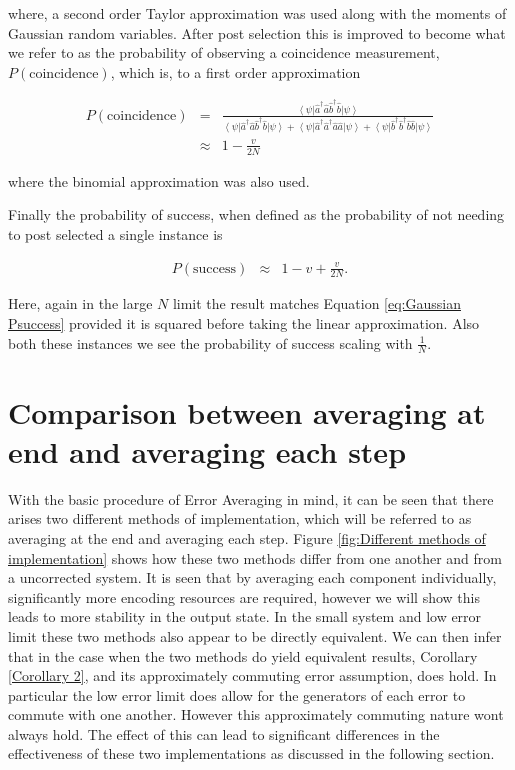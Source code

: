 \documentclass[aps,pra,twocolumn,superscriptaddress,numerical]{revtex4-1}
\begin{document}
		
		where, a second order Taylor approximation was used along with the moments of Gaussian random variables. After post selection this is improved to become what we refer to as the probability of observing a coincidence measurement, $P(\textrm{coincidence})$, which is, to a first order approximation
		
		\begin{widetext}
			\begin{eqnarray}
				P(\textrm{coincidence}) & = & \frac{\left\langle \psi\right|\hat{a}^{\dagger}\hat{a}\hat{b}^{\dagger}\hat{b}\left|\psi\right\rangle }{\left\langle \psi\right|\hat{a}^{\dagger}\hat{a}\hat{b}^{\dagger}\hat{b}\left|\psi\right\rangle +{}\left\langle \psi\right|\hat{a}^{\dagger}\hat{a}^{\dagger}\hat{a}\hat{a}\left|\psi\right\rangle +{}\left\langle \psi\right|\hat{b}^{\dagger}\hat{b}^{\dagger}\hat{b}\hat{b}\left|\psi\right\rangle }\nonumber \\
				& \approx & 1-\frac{v}{2N}\label{eq:2pNarb PS}
			\end{eqnarray}
		\end{widetext}
		
		where the binomial approximation was also used.
		
		Finally the probability of success, when defined as the probability of not needing to post selected a single instance is
		
		
		\begin{eqnarray}
			P(\textrm{success}) & \approx & 1-v+\frac{v}{2N}.\label{eq:2pNarb Success}
		\end{eqnarray}
	
		Here, again in the large $N$ limit the result matches Equation \ref{eq:Gaussian Psuccess} provided it is squared before taking the linear approximation. Also both these instances we see the probability of success scaling with $\frac{1}{N}$.
		
	\section{Comparison between averaging at end and averaging each step\label{averaging at end vs step}}
	
		With the basic procedure of Error Averaging in mind, it can be seen	that there arises two different methods of implementation, which will be referred to as averaging at the end and averaging each step. Figure \ref{fig:Different methods of implementation} shows how these two methods differ from one another and from a uncorrected	system. It is seen that by averaging each component individually, significantly more encoding resources are required, however we will show this leads to more stability in the output state. In the small system and low error limit these two methods also appear to be directly equivalent. We can then infer that in the case when the two methods do yield equivalent results, Corollary \ref{Corollary 2}, and its approximately commuting error assumption, does hold. In particular the low error limit does allow for the generators of each error to commute with one another. However this approximately commuting nature wont always hold. The effect of this can lead to significant differences in the effectiveness of these two implementations as discussed in the following section.
	
\end{document}
